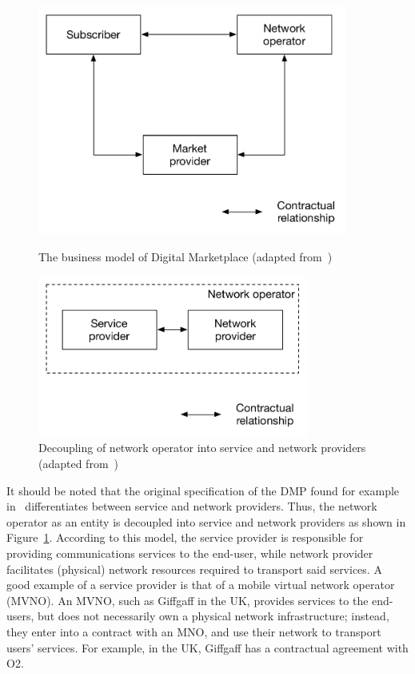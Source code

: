 \begin{figure}[p]
	\includegraphics[width=4in]{DMP/Figures/dmp_model}
	\caption{The business model of Digital Marketplace (adapted from~\cite{DMIrvine02})}
	\label{fig:dmp_model_dmp}
	\vspace{10mm}
	\includegraphics[width=3.5in]{DMP/Figures/no_decoupled}
	\caption{Decoupling of network operator into service and network providers (adapted from~\cite{DMIrvine02})}
	\label{fig:no_decoupled_dmp}
\end{figure}

It should be noted that the original specification of the DMP found for example in~\cite{DMLeBodic00,DMIrvine02,LeBodicThesis} differentiates between service and network providers. Thus, the network operator as an entity is decoupled into service and network providers as shown in Figure~\ref{fig:no_decoupled_dmp}. According to this model, the service provider is responsible for providing communications services to the end-user, while network provider facilitates (physical) network resources required to transport said services. A good example of a service provider is that of a mobile virtual network operator (MVNO). An MVNO, such as Giffgaff in the UK, provides services to the end-users, but does not necessarily own a physical network infrastructure; instead, they enter into a contract with an MNO, and use their network to transport users' services. For example, in the UK, Giffgaff has a contractual agreement with O2.

